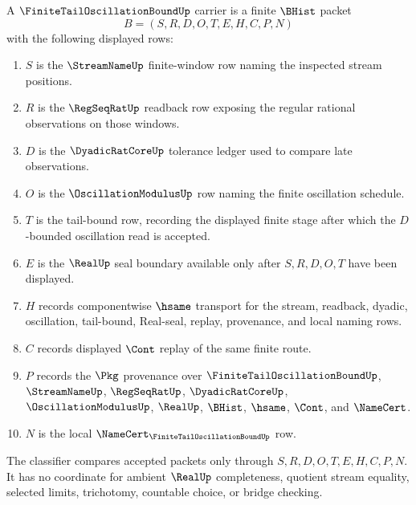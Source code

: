 \begin{definition}
\label{def:finite-tail-oscillation-bound-carrier}
A $\FiniteTailOscillationBoundUp$ carrier is a finite $\BHist$ packet
$$
B=(S,R,D,O,T,E,H,C,P,N)
$$
with the following displayed rows:
\begin{enumerate}
\item $S$ is the $\StreamNameUp$ finite-window row naming the inspected stream positions.
\item $R$ is the $\RegSeqRatUp$ readback row exposing the regular rational observations on those windows.
\item $D$ is the $\DyadicRatCoreUp$ tolerance ledger used to compare late observations.
\item $O$ is the $\OscillationModulusUp$ row naming the finite oscillation schedule.
\item $T$ is the tail-bound row, recording the displayed finite stage after which the $D$-bounded oscillation read is accepted.
\item $E$ is the $\RealUp$ seal boundary available only after $S,R,D,O,T$ have been displayed.
\item $H$ records componentwise $\hsame$ transport for the stream, readback, dyadic, oscillation, tail-bound, Real-seal, replay, provenance, and local naming rows.
\item $C$ records displayed $\Cont$ replay of the same finite route.
\item $P$ records the $\Pkg$ provenance over $\FiniteTailOscillationBoundUp$, $\StreamNameUp$, $\RegSeqRatUp$, $\DyadicRatCoreUp$, $\OscillationModulusUp$, $\RealUp$, $\BHist$, $\hsame$, $\Cont$, and $\NameCert$.
\item $N$ is the local $\NameCert_{\FiniteTailOscillationBoundUp}$ row.
\end{enumerate}
The classifier compares accepted packets only through $S,R,D,O,T,E,H,C,P,N$. It has no coordinate for ambient $\RealUp$ completeness, quotient stream equality, selected limits, trichotomy, countable choice, or bridge checking.
\end{definition}

